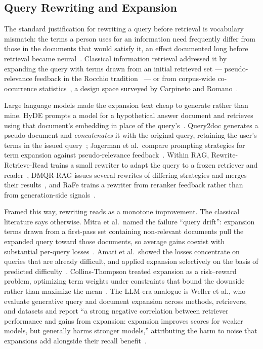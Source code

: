\documentclass[acmsmall,review,anonymous,screen]{acmart}
\begin{document}
\subsection{Query Rewriting and Expansion}

The standard justification for rewriting a query before retrieval is vocabulary
mismatch: the terms a person uses for an information need frequently differ from
those in the documents that would satisfy it, an effect documented long before
retrieval became neural~\cite{furnas1987vocabulary}. Classical information
retrieval addressed it by expanding the query with terms drawn from an initial
retrieved set --- pseudo-relevance feedback in the Rocchio
tradition~\cite{rocchio1971relevance} --- or from corpus-wide co-occurrence
statistics~\cite{xu1996localglobal}, a design space surveyed by Carpineto and
Romano~\cite{carpineto2012survey}.

Large language models made the expansion text cheap to generate rather than
mine. HyDE prompts a model for a hypothetical answer document and retrieves
using that document's embedding in place of the query's~\cite{gao2023hyde}.
Query2doc generates a pseudo-document and \emph{concatenates} it with the
original query, retaining the user's terms in the issued
query~\cite{wang2023query2doc}; Jagerman et al.\ compare prompting strategies
for term expansion against pseudo-relevance
feedback~\cite{jagerman2023expansion}. Within RAG,
Rewrite-Retrieve-Read trains a small rewriter to adapt the query to a frozen
retriever and reader~\cite{ma2023rewrite}, DMQR-RAG issues several rewrites of
differing strategies and merges their results~\cite{gao2024dmqr}, and RaFe
trains a rewriter from reranker feedback rather than from generation-side
signals~\cite{ma2023rafe}.

Framed this way, rewriting reads as a monotone improvement. The classical
literature says otherwise. Mitra et al.\ named the failure ``query drift'':
expansion terms drawn from a first-pass set containing non-relevant documents
pull the expanded query toward those documents, so average gains coexist with
substantial per-query losses~\cite{mitra1998expansion}. Amati et al.\ showed the
losses concentrate on queries that are already difficult, and applied expansion
selectively on the basis of predicted difficulty~\cite{amati2004drift}.
Collins-Thompson treated expansion as a risk--reward problem, optimizing term
weights under constraints that bound the downside rather than maximize the
mean~\cite{collinsthompson2009risk}. The LLM-era analogue is Weller et al., who
evaluate generative query and document expansion across methods, retrievers, and
datasets and report ``a strong negative correlation between retriever
performance and gains from expansion: expansion improves scores for weaker
models, but generally harms stronger models,'' attributing the harm to noise
that expansions add alongside their recall
benefit~\cite{weller2024expansions}.
\end{document}
